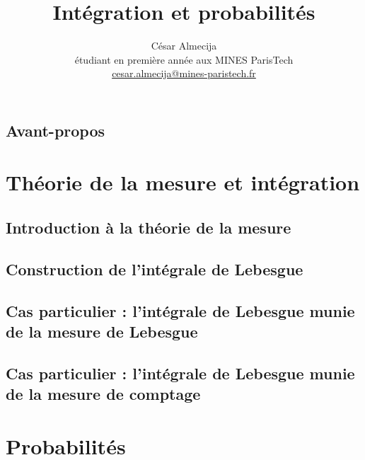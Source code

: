 \documentclass[french]{report}
\theoremstyle{plain}
\theoremstyle{definition}
\theoremstyle{remark}
\begin{document}
\title{Intégration et probabilités}

\author{César Almecija
\\ étudiant en première année aux MINES ParisTech
\\ \href{mailto:cesar.almecija@mines-paristech.fr}{cesar.almecija@mines-paristech.fr}}

\maketitle

\tableofcontents

\chapter*{Avant-propos}



\part{Théorie de la mesure et intégration}

\chapter{Introduction à la théorie de la mesure}



\chapter{Construction de l'intégrale de Lebesgue}



\chapter{Cas particulier : l'intégrale de Lebesgue munie de la mesure de Lebesgue}



\chapter{Cas particulier : l'intégrale de Lebesgue munie de la mesure de comptage}



\part{Probabilités}
\end{document}
